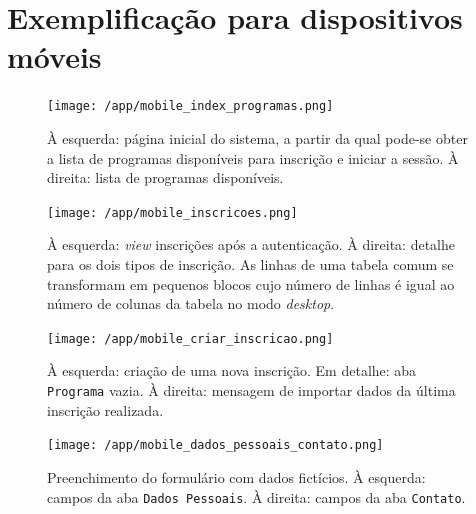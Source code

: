 \documentclass[
  10.5pt,				  %
	openright,			%
	twoside,			  %
  a5paper,
  chapter=TITLE,	%
	section=TITLE,	%
  hyphens,        %
	english,        %
	brazil          %
]{abntex2}
\begin{document}
\chapter{Exemplificação para dispositivos móveis}\label{anexo:mobile}

\begin{figure}[!ht]
  \caption{\label{fig:mobile_index_programas} À esquerda: página inicial do sistema, a partir da qual pode-se obter a lista de programas disponíveis para inscrição e iniciar a sessão. À direita: lista de programas disponíveis. }
  \begin{center}
    \texttt{[image: /app/mobile\_index\_programas.png]}
  \end{center}
\end{figure}


\begin{figure}[!ht]
  \caption{\label{fig:mobile_inscricoes} À esquerda: \emph{view} inscrições após a autenticação. À direita: detalhe para os dois tipos de inscrição. As linhas de uma tabela comum se transformam em pequenos blocos cujo número de linhas é igual ao número de colunas da tabela no modo \emph{desktop}.}
  \begin{center}
    \texttt{[image: /app/mobile\_inscricoes.png]}
  \end{center}
\end{figure}

\begin{figure}[!ht]
  \caption{\label{fig:mobile_criar_inscricao} À esquerda: criação de uma nova inscrição. Em detalhe: aba \texttt{Programa} vazia. À direita: mensagem de importar dados da última inscrição realizada.}
  \begin{center}
    \texttt{[image: /app/mobile\_criar\_inscricao.png]}
  \end{center}
\end{figure}

\begin{figure}[!ht]
  \caption{\label{fig:mobile_dados_pessoais_contato} Preenchimento do formulário com dados fictícios. À esquerda: campos da aba \texttt{Dados Pessoais}. À direita: campos da aba \texttt{Contato}.}
  \begin{center}
    \texttt{[image: /app/mobile\_dados\_pessoais\_contato.png]}
  \end{center}
\end{figure}
\end{document}
